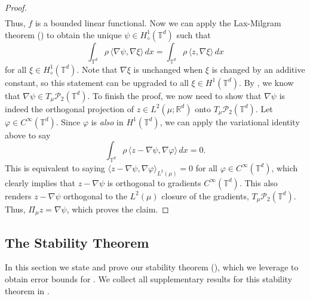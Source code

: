 \documentclass[11pt]{article}
\begin{document}
\begin{proof}
\begin{align*}
    \end{align*}
    Thus, $f$ is a bounded linear functional. Now we can apply the Lax-Milgram theorem () to obtain the unique $\psi \in H^1_\diamond(\mathbb{T}^d)$ such that 
    \[\int_{\mathbb{T}^d}\rho \, \langle \nabla \psi, \nabla \xi\rangle \, dx = \int_{\mathbb{T}^d}\rho \, \langle z, \nabla \xi\rangle\, dx\]
    for all $\xi \in H^1_\diamond(\mathbb{T}^d).$ Note that $\nabla \xi$ is unchanged when $\xi$ is changed by an additive constant, so this statement can be upgraded to all $\xi \in H^1(\mathbb{T}^d).$ By , we know that $\nabla \psi \in T_\mu\mathcal{P}_2(\mathbb{T}^d).$ To finish the proof, we now need to show that $\nabla \psi$ is indeed the orthogonal projection of $z \in L^2(\mu; \mathbb{R}^d)$ onto $T_\mu\mathcal{P}_2(\mathbb{T}^d).$ Let $\varphi \in C^\infty(\mathbb{T}^d)$. Since $\varphi$ is \textit{also} in $H^1(\mathbb{T}^d)$, we can apply the variational identity above to say
    \[\int_{\mathbb{T}^d}\rho \, \langle z - \nabla \psi, \nabla \varphi\rangle \, dx = 0.\]
    This is equivalent to saying $\langle z - \nabla \psi, \nabla \varphi\rangle_{L^2(\mu)} = 0$ for all $\varphi \in C^\infty(\mathbb{T}^d)$, which clearly implies that $z - \nabla \psi$ is orthogonal to gradients $C^\infty(\mathbb{T}^d)$. This also renders $z - \nabla \psi$ orthogonal to the $L^2(\mu)$ closure of the gradients, $T_\mu\mathcal{P}_2(\mathbb{T}^d).$ Thus, $\Pi_\mu z = \nabla \psi$, which proves the claim. 
\end{proof}

\subsection{The Stability Theorem} \label{sec: stability theory}

In this section we state and prove our stability theorem (), which we leverage to obtain error bounds for . We collect all supplementary results for this stability theorem in .
\end{document}
